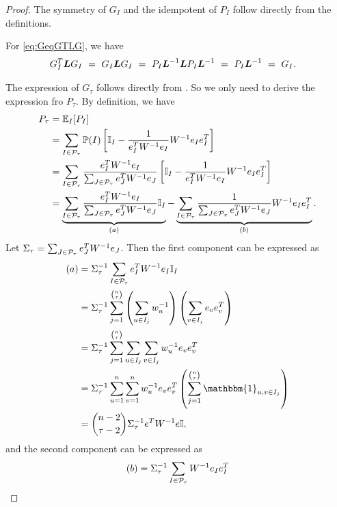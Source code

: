\begin{proof}
    The symmetry of $G_{I}$ and the idempotent of $P_{I}$ follow directly from the definitions. 
    
    For \eqref{eq:GeqGTLG}, we have
    \begin{align*}
        G_{I}^T \boldsymbol{L} G_{I} &~=~ G_{I} \boldsymbol{L} G_{I} ~=~ P_{I} \boldsymbol{L}^{-1} \boldsymbol{L} P_{I} \boldsymbol{L}^{-1} ~=~ P_{I} \boldsymbol{L}^{-1} ~=~ G_{I}.
    \end{align*}

    The expression of $G_\tau$ follows directly from \cite[Theorem~3.3]{necoara2017random}. So we only need to derive the expression fro $P_\tau$. By definition, we have 
    \begin{align*}
        P_\tau &= \mathbb{E}_I[P_I]\\
        &= \sum_{I \in \mathcal{P}_\tau} \mathbb{P}(I) \left[ \mathbb{I}_I - \frac{1}{e_I^TW^{-1}e_I}W^{-1}e_Ie_I^T \right]\\
        &= \sum_{I \in \mathcal{P}_\tau} \frac{e_I^TW^{-1}e_I}{\sum_{J \in \mathcal{P}_\tau} e_J^TW^{-1}e_J} \left[ \mathbb{I}_I - \frac{1}{e_I^TW^{-1}e_I}W^{-1}e_Ie_I^T \right]\\
        &= \underbrace{\sum_{I \in \mathcal{P}_\tau} \frac{e_I^TW^{-1}e_I}{\sum_{J \in \mathcal{P}_\tau} e_J^TW^{-1}e_J} \mathbb{I}_I}_{(a)} - \underbrace{\sum_{I \in \mathcal{P}_\tau} \frac{1}{\sum_{J \in \mathcal{P}_\tau} e_J^TW^{-1}e_J}W^{-1}e_Ie_I^T}_{(b)}.
    \end{align*}
    Let $\Sigma_\tau = \sum_{J \in \mathcal{P}_\tau} e_J^TW^{-1}e_J$. Then the first component can be expressed as 
    \begin{align*}
        (a) &= \Sigma_\tau^{-1} \sum_{I \in \Pscr_\tau} e_I^TW^{-1}e_I \mathbb{I}_I\\
        &= \Sigma_\tau^{-1} \sum_{j=1}^{\binom{n}{\tau}} \left(\sum_{u \in I_j}w_u^{-1}\right)\left(\sum_{v \in I_j}e_ve_v^T\right)\\
        &= \Sigma_\tau^{-1} \sum_{j=1}^{\binom{n}{\tau}} \sum_{u \in I_j} \sum_{v \in I_j} w_u^{-1} e_ve_v^T \\
        &= \Sigma_\tau^{-1} \sum_{u=1}^n \sum_{v=1}^n w_u^{-1} e_ve_v^T \left(\sum_{j=1}^{\binom{n}{\tau}} \mathbbm{1}_{u,v \in I_j} \right)\\
        &= \binom{n-2}{\tau-2}\Sigma_\tau^{-1}e^TW^{-1}e \mathbb{I},
    \end{align*}
    and the second component can be expressed as 
    \begin{align*}
        (b) &= \Sigma_\tau^{-1} \sum_{I \in \Pscr_\tau} W^{-1}e_Ie_I^T\\

\end{align*}
\end{proof}
